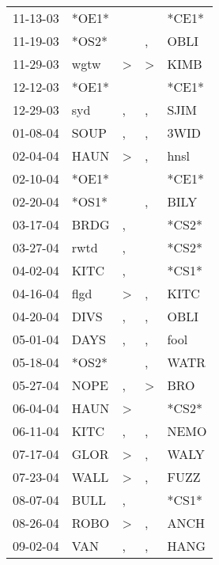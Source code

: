 \begin{supertabular}{lllll}
 11-13-03 &  *OE1* &                  &                  &  *CE1* \\
 11-19-03 &  *OS2* &                  &                , &   OBLI \\
 11-29-03 &   wgtw &     \textgreater &     \textgreater &   KIMB \\
 12-12-03 &  *OE1* &                  &                  &  *CE1* \\
 12-29-03 &    syd &                , &                , &   SJIM \\
 01-08-04 &   SOUP &                , &                , &   3WID \\
 02-04-04 &   HAUN &     \textgreater &                , &   hnsl \\
 02-10-04 &  *OE1* &                  &                  &  *CE1* \\
 02-20-04 &  *OS1* &                  &                , &   BILY \\
 03-17-04 &   BRDG &                , &                  &  *CS2* \\
 03-27-04 &   rwtd &                , &                  &  *CS2* \\
 04-02-04 &   KITC &                , &                  &  *CS1* \\
 04-16-04 &   flgd &     \textgreater &                , &   KITC \\
 04-20-04 &   DIVS &                , &                , &   OBLI \\
 05-01-04 &   DAYS &                , &                , &   fool \\
 05-18-04 &  *OS2* &                  &                , &   WATR \\
 05-27-04 &   NOPE &                , &     \textgreater &    BRO \\
 06-04-04 &   HAUN &     \textgreater &                  &  *CS2* \\
 06-11-04 &   KITC &                , &                , &   NEMO \\
 07-17-04 &   GLOR &     \textgreater &                , &   WALY \\
 07-23-04 &   WALL &     \textgreater &                , &   FUZZ \\
 08-07-04 &   BULL &                , &                  &  *CS1* \\
 08-26-04 &   ROBO &     \textgreater &                , &   ANCH \\
 09-02-04 &    VAN &                , &                , &   HANG \\

\end{supertabular}
